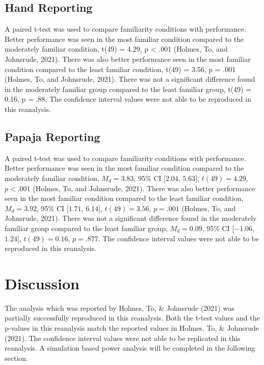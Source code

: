 \documentclass[
  english,
  man]{apa6}
\begin{document}
\hypertarget{hand-reporting}{%
\subsection{Hand Reporting}\label{hand-reporting}}

A paired t-test was used to compare familiarity conditions with performance. Better performance was seen in the most familiar condition compared to the moderately familiar condition, t(49) = 4.29, p \textless{} .001 (Holmes, To, and Johnsrude, 2021). There was also better performance seen in the most familiar condition compared to the least familiar condition, t(49) = 3.56, p = .001 (Holmes, To, and Johnsrude, 2021). There was not a significant difference found in the moderately familiar group compared to the least familiar group, t(49) = 0.16, p = .88. The confidence interval values were not able to be reproduced in this reanalysis.

\hypertarget{papaja-reporting}{%
\subsection{Papaja Reporting}\label{papaja-reporting}}

A paired t-test was used to compare familiarity conditions with performance. Better performance was seen in the most familiar condition compared to the moderately familiar condition, \(M_d = 3.83\), 95\% CI \([2.04\), \(5.63]\), \(t(49) = 4.29\), \(p < .001\) (Holmes, To, and Johnsrude, 2021). There was also better performance seen in the most familiar condition compared to the least familiar condition, \(M_d = 3.92\), 95\% CI \([1.71\), \(6.14]\), \(t(49) = 3.56\), \(p = .001\) (Holmes, To, and Johnsrude, 2021). There was not a significant difference found in the moderately familiar group compared to the least familiar group, \(M_d = 0.09\), 95\% CI \([-1.06\), \(1.24]\), \(t(49) = 0.16\), \(p = .877\). The confidence interval values were not able to be reproduced in this reanalysis.

\hypertarget{discussion}{%
\section{Discussion}\label{discussion}}

The analysis which was reported by Holmes, To, \& Johnsrude (2021) was partially successfully reproduced in this reanalysis. Both the t-test values and the p-values in this reanalysis match the reported values in Holmes, To, \& Johnsrude (2021). The confidence interval values were not able to be replicated in this reanalysis. A simulation based power analysis will be completed in the following section.
\end{document}

